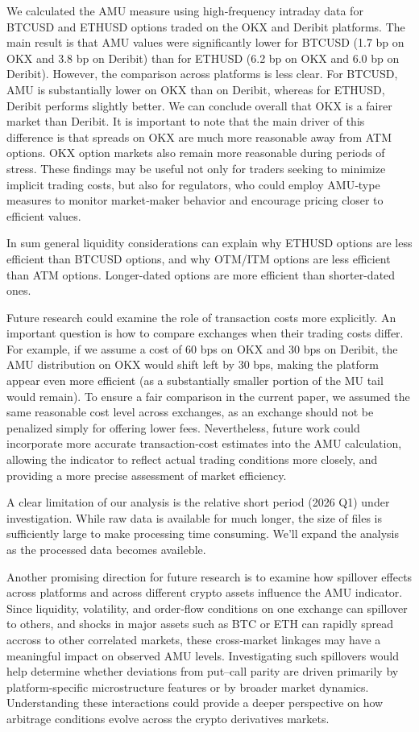 \documentclass[12pt]{article}
\begin{document}
We calculated the AMU measure using high‑frequency intraday data for BTCUSD and ETHUSD options traded on the OKX and Deribit platforms. The main result is that AMU values were significantly lower for BTCUSD (1.7 bp on OKX and 3.8 bp on Deribit) than for ETHUSD (6.2 bp on OKX and 6.0 bp on Deribit). However, the comparison across platforms is less clear. For BTCUSD, AMU is substantially lower on OKX than on Deribit, whereas for ETHUSD, Deribit performs slightly better. We can conclude overall that OKX is a fairer market than Deribit. It is important to note that the main driver of this difference is that spreads on OKX are much more reasonable away from ATM options. OKX option markets also remain more reasonable during periods of stress. These findings may be useful not only for traders seeking to minimize implicit trading costs, but also for regulators, who could employ AMU‑type measures to monitor market‑maker behavior and encourage pricing closer to efficient values. 

In sum general liquidity considerations can explain why ETHUSD options are less efficient than BTCUSD options, and why OTM/ITM options are less efficient than ATM options. Longer-dated options are more efficient than shorter-dated ones. 

Future research could examine the role of transaction costs more explicitly. An important question is how to compare exchanges when their trading costs differ. For example, if we assume a cost of 60 bps on OKX and 30 bps on Deribit, the AMU distribution on OKX would shift left by 30 bps, making the platform appear even more efficient (as a substantially smaller portion of the MU tail would remain). To ensure a fair comparison in the current paper, we assumed the same reasonable cost level across exchanges, as an exchange should not be penalized simply for offering lower fees. Nevertheless, future work could incorporate more accurate transaction‑cost estimates into the AMU calculation, allowing the indicator to reflect actual trading conditions more closely, and providing a more precise assessment of market efficiency.

A clear limitation of our analysis is the relative short period (2026 Q1) under investigation. While raw data is available for much longer, the size of files is sufficiently large to make processing time consuming. We'll expand the analysis as the processed data becomes availeble.  

Another promising direction for future research is to examine how spillover effects across platforms and across different crypto assets influence the AMU indicator. Since liquidity, volatility, and order‑flow conditions on one exchange can spillover to others, and shocks in major assets such as BTC or ETH can rapidly spread accross to other correlated markets, these cross‑market linkages may have a meaningful impact on observed AMU levels. Investigating such spillovers would help determine whether deviations from put–call parity are driven primarily by platform‑specific microstructure features or by broader market dynamics. Understanding these interactions could provide a deeper perspective on how arbitrage conditions evolve across the crypto derivatives markets.
\end{document}
